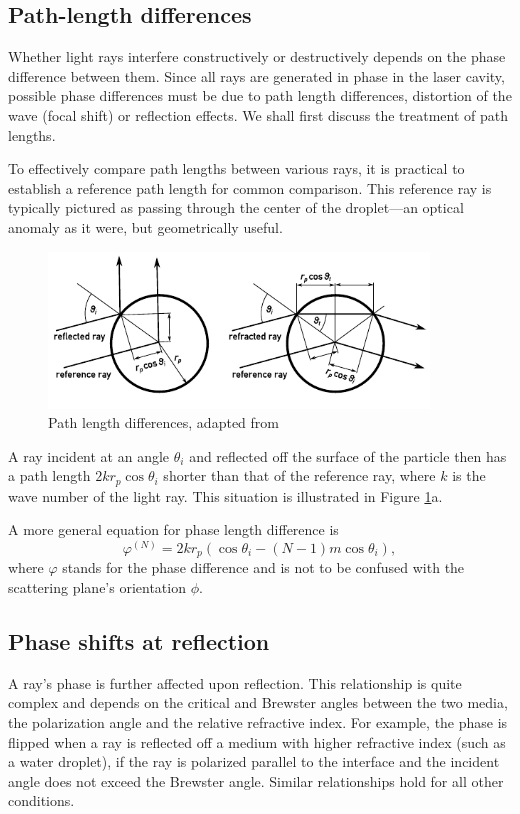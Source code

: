 \documentclass[11.5pt,oneside]{book}
\begin{document}
\subsection{Path-length differences}
Whether light rays interfere constructively or destructively depends on the
phase difference between them. Since all rays are generated in phase in the
laser cavity, possible phase differences must be due to path length differences,
distortion of the wave (focal shift) or reflection effects. We shall first
discuss the treatment of path lengths.

To effectively compare path lengths between various rays, it is practical to
establish a reference path length for common comparison. This reference ray is
typically pictured as passing through the center of the droplet---an optical
anomaly as it were, but geometrically useful.

\begin{figure}
\centering
\includegraphics[width=0.9\textwidth]{img/scattering/pathlength.pdf}
\caption{Path length differences, adapted from \citet{Albrecht03}}
\label{fig:pathlength}
\end{figure}

A ray incident at an angle $\theta_i$ and reflected off the surface of the
particle then has a path length $2kr_p \cos \theta_i$ shorter than that of the
reference ray, where $k$ is the wave number of the light ray. This situation is
illustrated in Figure \ref{fig:pathlength}a.

A more general equation for phase length difference is
\begin{equation}
    \varphi^{(N)} = 2kr_p(\cos \theta_i - (N-1)m \cos \theta_i),
\end{equation}
where $\varphi$ stands for the phase difference and is not to be confused with
the scattering plane's orientation $\phi$.

\subsection{Phase shifts at reflection}
A ray's phase is further affected upon reflection. This relationship is quite
complex and depends on the critical and Brewster angles between the two media,
the polarization angle and the relative refractive index. For example, the phase
is flipped when a ray is reflected off a medium with higher refractive index
(such as a water droplet), if the ray is polarized parallel to the interface and
the incident angle does not exceed the Brewster angle. Similar relationships
hold for all other conditions.
\end{document}
